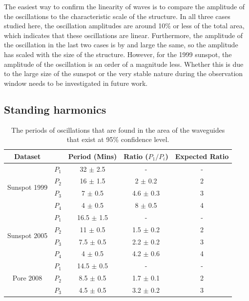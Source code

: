 	The easiest way to confirm the linearity of waves is to compare the amplitude of the oscillations to the characteristic scale of the structure.
	In all three cases studied here, the oscillation amplitudes are around 10\% or less of the total area, which indicates that these oscillations are linear.
	Furthermore, the amplitude of the oscillation in the last two cases is by and large the same, so the amplitude has scaled with the size of the structure.
	However, for the 1999 sunspot, the amplitude of the oscillation is an order of a magnitude less. Whether this is due to the large size of the sunspot or the very stable nature during the observation window needs to be investigated in future work.
	
\subsection{Standing harmonics}

	\begin{table}
	\centering
	\begin{tabular}{ccccc}
		\hline
		Dataset & & Period (Mins) & Ratio ($P_{1}/P_{i}$) & Expected Ratio \\ \hline \hline
		\multirow{4}{*}{Sunspot 1999} & $P_{1}$ & 32 $\pm$ 2.5 & - & -\\
							  		  & $P_{2}$ & 16 $\pm$ 1.5 & 2 $\pm$ 0.2 & 2\\
							  		  & $P_{3}$ & 7 $\pm$ 0.5 & 4.6 $\pm$ 0.3 & 3\\
							  		  & $P_{4}$ & 4 $\pm$ 0.5 & 8 $\pm$ 0.5 & 4\\ \hline
		\multirow{4}{*}{Sunspot 2005} & $P_{1}$ & 16.5 $\pm$ 1.5  & - & -\\
					      			  & $P_{2}$ & 11 $\pm$ 0.5 & 1.5 $\pm$ 0.2 & 2\\
					      			  & $P_{3}$ & 7.5 $\pm$ 0.5 & 2.2 $\pm$ 0.2 & 3\\
					      			  & $P_{4}$ & 4 $\pm$ 0.5 & 4.2 $\pm$ 0.6 & 4\\ \hline
		\multirow{4}{*}{Pore 2008}    & $P_{1}$ & 14.5 $\pm$ 0.5 & - & -\\
		 							  & $P_{2}$ & 8.5 $\pm$ 0.5 & 1.7 $\pm$ 0.1 & 2\\
					      			  & $P_{3}$ & 4.5 $\pm$ 0.5 & 3.2 $\pm$ 0.2 & 3\\ \hline
	\end{tabular}
		\caption{The periods of oscillations that are found in the area of the waveguides that exist at 95\% confidence level.}
		\label{chap3:harm_table}
	\end{table}
		
